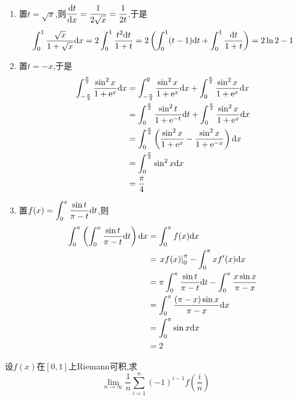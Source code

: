 \documentclass{ctexart}
\begin{document}
\begin{solution}[Solution.]
    \begin{enumerate}[label=\textbf{(\arabic*)}]
        \item 置$t=\sqrt{x}$,则$\dfrac{\mathrm{d} t}{\mathrm{d} x}=\dfrac{1}{2\sqrt{x}}=\dfrac{1}{2t}$.于是
            $$\int_0^1\dfrac{\sqrt{x}}{1+\sqrt{x}}\mathrm{d} x=2\int_0^1\dfrac{t^2\mathrm{d} t}{1+t}=2\left(\int_0^1(t-1)\mathrm{d} t+\int_0^1\dfrac{\mathrm{d} t}{1+t}\right)=2\ln2-1$$
        \item 置$t=-x$,于是\\
            $$\begin{aligned}
                \int_{-\frac{\pi}{2}}^{\frac{\pi}{2}}\dfrac{\sin^2x}{1+\mathrm{e}^x}\mathrm{d} x
                &= \int_{-\frac{\pi}{2}}^{0}\dfrac{\sin^2x}{1+\mathrm{e}^x}\mathrm{d} x+\int_{0}^{\frac{\pi}{2}}\dfrac{\sin^2x}{1+\mathrm{e}^x}\mathrm{d} x \\
                &= \int_{0}^{\frac{\pi}{2}}\dfrac{\sin^2t}{1+\mathrm{e}^{-t}}\mathrm{d} t+\int_{0}^{\frac{\pi}{2}}\dfrac{\sin^2x}{1+\mathrm{e}^x}\mathrm{d} x \\
                &= \int_{0}^{\frac{\pi}{2}}\left(\dfrac{\sin^2x}{1+\mathrm{e}^x}-\dfrac{\sin^2x}{1+\mathrm{e}^{-x}}\right)\mathrm{d} x \\
                &= \int_{0}^{\frac{\pi}{2}}\sin^2x\mathrm{d} x \\
                &= \dfrac{\pi}{4}
            \end{aligned}$$
        \item 置$\displaystyle f(x)=\int_0^x\dfrac{\sin t}{\pi-t}\mathrm{d} t$,则
            $$\begin{aligned}
                \int_{0}^{\pi}\left(\int_{0}^{x}\dfrac{\sin t}{\pi-t}\mathrm{d} t\right)\mathrm{d} x
                &= \int_{0}^{\pi}f(x)\mathrm{d} x \\
                &= \left.xf(x)\right|_0^{\pi}-\int_0^\pi xf'(x)\mathrm{d} x \\
                &= \pi\int_0^\pi\dfrac{\sin t}{\pi-t}\mathrm{d} t-\int_0^\pi\dfrac{x\sin x}{\pi-x} \\
                &= \int_0^\pi\dfrac{(\pi-x)\sin x}{\pi-x}\mathrm{d} x \\
                &= \int_0^\pi\sin x\mathrm{d} x \\
                &= 2
            \end{aligned}$$
    \end{enumerate}
\end{solution}
\begin{problem}[6.(10\songti{分})]
    设$f(x)$在$[0,1]$上Riemann可积,求$$\lim_{n\to\infty}\dfrac{1}{n}\sum_{i=1}^{n}(-1)^{i-1}f\left(\dfrac{i}{n}\right)$$
\end{problem}
\end{document}
